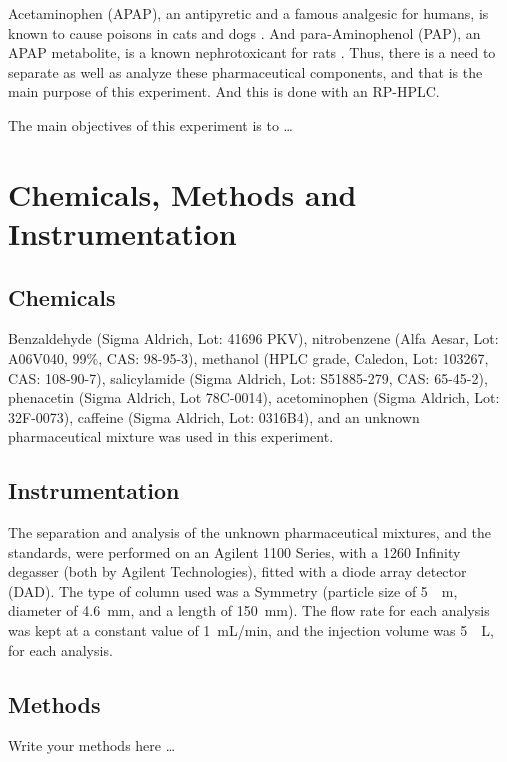 \documentclass[a4paper, 12pt]{article}
\begin{document}
Acetaminophen (APAP), an antipyretic and a famous analgesic for humans, is known to cause poisons in cats and dogs \cite{dogs-cats}. And para-Aminophenol (PAP), an APAP metabolite, is a known nephrotoxicant for rats \cite{rats}. Thus, there is a need to separate as well as analyze these pharmaceutical components, and that is the main purpose of this experiment. And this is done with an RP-HPLC.

The main objectives of this experiment is to \ldots{}


\section{Chemicals, Methods and Instrumentation}

\subsection{Chemicals}
Benzaldehyde (Sigma Aldrich, Lot: 41696 PKV), nitrobenzene (Alfa Aesar, Lot: A06V040, 99\%, CAS: 98-95-3), methanol (HPLC grade, Caledon, Lot: 103267, CAS: 108-90-7), salicylamide (Sigma Aldrich, Lot: S51885-279, CAS: 65-45-2), phenacetin (Sigma Aldrich, Lot 78C-0014), acetominophen (Sigma Aldrich, Lot: 32F-0073), caffeine (Sigma Aldrich, Lot: 0316B4), and an unknown pharmaceutical mixture was used in this experiment.

\subsection{Instrumentation}
The separation and analysis of the unknown pharmaceutical mixtures, and the standards, were performed on an Agilent 1100 Series, with a 1260 Infinity degasser (both by Agilent Technologies), fitted with a diode array detector (DAD). The type of column used was a Symmetry\textregistered{}  (particle size of \SI{5}{\mu{}m}, diameter of \SI{4.6}{mm}, and a length of \SI{150}{mm}). The flow rate for each analysis was kept at a constant value of \SI{1}{mL/min}, and the injection volume was \SI{5}{\mu{}L}, for each analysis.

\subsection{Methods}
Write your methods here \dots
\end{document}
